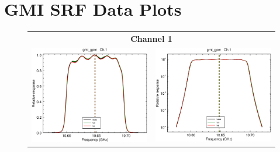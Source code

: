 \section{GMI SRF Data Plots}
\label{app.srf_data_plots}

\begin{figure}[H]
  \centering
  \begin{tabular}{c c}
    \multicolumn{2}{c}{\sffamily\textbf{Channel 1}}\\
    \includegraphics[scale=0.35]{graphics/lin/gmi_gpm-1.eps} &
    \includegraphics[scale=0.35]{graphics/log/gmi_gpm-1.eps} \\

\end{tabular}
\end{figure}
